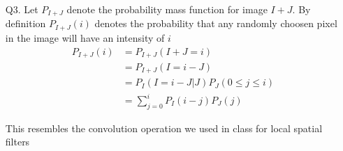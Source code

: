 \documentclass[11pt]{article}
\begin{document}
\maketitle

\begin{enumerate}

\item[Q3.] Let $P_{I+J}$ denote the probability mass function for image $I+J$. By definition $P_{I+J}(i)$ denotes the probability that any randomly choosen pixel in the image will have an intensity of $i$
\begin{equation}
    \begin{aligned}
        P_{I+J}(i) &= P_{I+J}(I+J = i) \\
        &= P_{I+J}(I = i - J) \\
        &= P_{I}(I = i - J | J)P_{J}(0 \le j \le i) \\
        &= \sum\limits_{j=0}^{i} P_{I}(i-j)P_{J}(j)
    \end{aligned}
\end{equation}

This resembles the convolution operation we used in class for local spatial filters

\end{enumerate}
\end{document}
